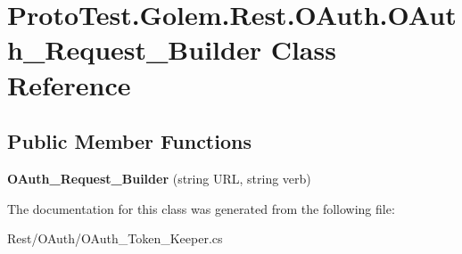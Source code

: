 \hypertarget{class_proto_test_1_1_golem_1_1_rest_1_1_o_auth_1_1_o_auth___request___builder}{\section{Proto\-Test.\-Golem.\-Rest.\-O\-Auth.\-O\-Auth\-\_\-\-Request\-\_\-\-Builder Class Reference}
\label{class_proto_test_1_1_golem_1_1_rest_1_1_o_auth_1_1_o_auth___request___builder}
}
\subsection*{Public Member Functions}
\begin{DoxyCompactItemize}
\item 
\hypertarget{class_proto_test_1_1_golem_1_1_rest_1_1_o_auth_1_1_o_auth___request___builder_aec36dae174451be0436ba2cd243f739c}{{\bfseries O\-Auth\-\_\-\-Request\-\_\-\-Builder} (string U\-R\-L, string verb)}\label{class_proto_test_1_1_golem_1_1_rest_1_1_o_auth_1_1_o_auth___request___builder_aec36dae174451be0436ba2cd243f739c}

\end{DoxyCompactItemize}


The documentation for this class was generated from the following file\-:\begin{DoxyCompactItemize}
\item 
Rest/\-O\-Auth/O\-Auth\-\_\-\-Token\-\_\-\-Keeper.\-cs\end{DoxyCompactItemize}
